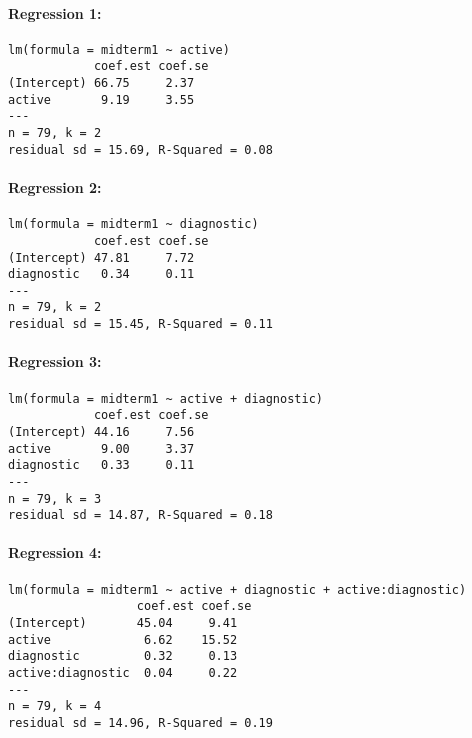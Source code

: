 \documentclass[addpoints,12pt]{exam}
\begin{document}
\begin{table}
\footnotesize
\caption{Regression Results}
\paragraph{Regression 1:}
\begin{verbatim}
lm(formula = midterm1 ~ active)
            coef.est coef.se
(Intercept) 66.75     2.37  
active       9.19     3.55  
---
n = 79, k = 2
residual sd = 15.69, R-Squared = 0.08
\end{verbatim}

\paragraph{Regression 2:}
\begin{verbatim}
lm(formula = midterm1 ~ diagnostic)
            coef.est coef.se
(Intercept) 47.81     7.72  
diagnostic   0.34     0.11  
---
n = 79, k = 2
residual sd = 15.45, R-Squared = 0.11
\end{verbatim}

\paragraph{Regression 3:}
\begin{verbatim}
lm(formula = midterm1 ~ active + diagnostic)
            coef.est coef.se
(Intercept) 44.16     7.56  
active       9.00     3.37  
diagnostic   0.33     0.11  
---
n = 79, k = 3
residual sd = 14.87, R-Squared = 0.18
\end{verbatim}

\paragraph{Regression 4:}
\begin{verbatim}
lm(formula = midterm1 ~ active + diagnostic + active:diagnostic)
                  coef.est coef.se
(Intercept)       45.04     9.41  
active             6.62    15.52  
diagnostic         0.32     0.13  
active:diagnostic  0.04     0.22  
---
n = 79, k = 4
residual sd = 14.96, R-Squared = 0.19
\end{verbatim}


\label{tab:reg}
\end{table}
\end{document}
